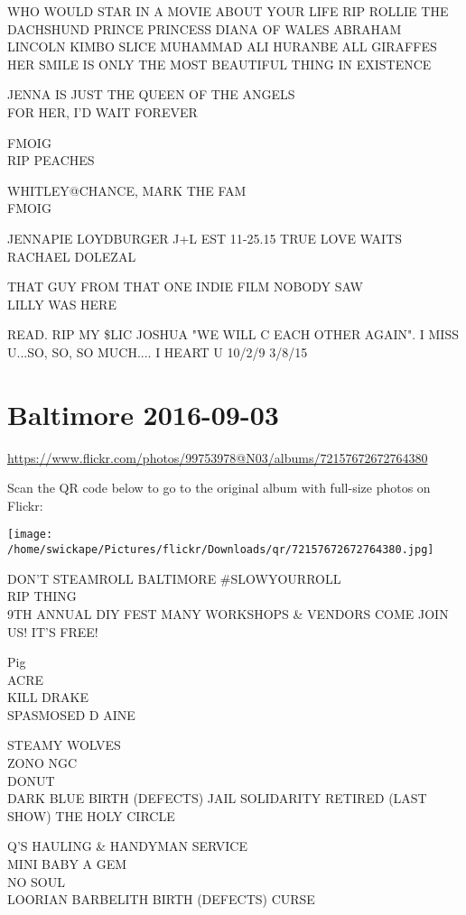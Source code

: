 \documentclass[10pt,letterpaper]{article}
\begin{document}
WHO WOULD STAR IN A MOVIE ABOUT YOUR LIFE RIP ROLLIE THE DACHSHUND PRINCE PRINCESS DIANA OF WALES ABRAHAM LINCOLN KIMBO SLICE MUHAMMAD ALI HURANBE ALL GIRAFFES\\
HER SMILE IS ONLY THE MOST BEAUTIFUL THING IN  EXISTENCE

JENNA IS JUST THE QUEEN OF THE ANGELS\\
FOR HER, I'D WAIT FOREVER

FMOIG\\
RIP PEACHES

WHITLEY@CHANCE, MARK THE FAM\\
FMOIG

JENNAPIE LOYDBURGER J+L EST 11{-}25.15 TRUE LOVE WAITS\\
RACHAEL DOLEZAL

THAT GUY FROM THAT ONE INDIE FILM NOBODY SAW\\
LILLY WAS HERE

READ.  RIP MY \$LIC JOSHUA "WE WILL C EACH OTHER AGAIN".  I MISS U...SO, SO, SO MUCH.... I HEART U 10/2/9 3/8/15
\pagebreak

\section*{Baltimore 2016-09-03}

\url{https://www.flickr.com/photos/99753978@N03/albums/72157672672764380}

Scan the QR code below to go to the original album with full-size photos on Flickr:

\texttt{[image: /home/swickape/Pictures/flickr/Downloads/qr/72157672672764380.jpg]}
\pagebreak

DON'T STEAMROLL BALTIMORE \#SLOWYOURROLL\\
RIP THING\\
9TH ANNUAL DIY FEST MANY WORKSHOPS \& VENDORS COME JOIN US!  IT'S FREE!

Pig\\
ACRE\\
KILL DRAKE\\
SPASMOSED D AINE

STEAMY WOLVES\\
ZONO NGC\\
DONUT\\
DARK BLUE BIRTH (DEFECTS) JAIL SOLIDARITY RETIRED (LAST SHOW) THE HOLY CIRCLE

Q'S HAULING \& HANDYMAN SERVICE\\
MINI BABY A GEM\\
NO SOUL\\
LOORIAN BARBELITH BIRTH (DEFECTS) CURSE
\end{document}
